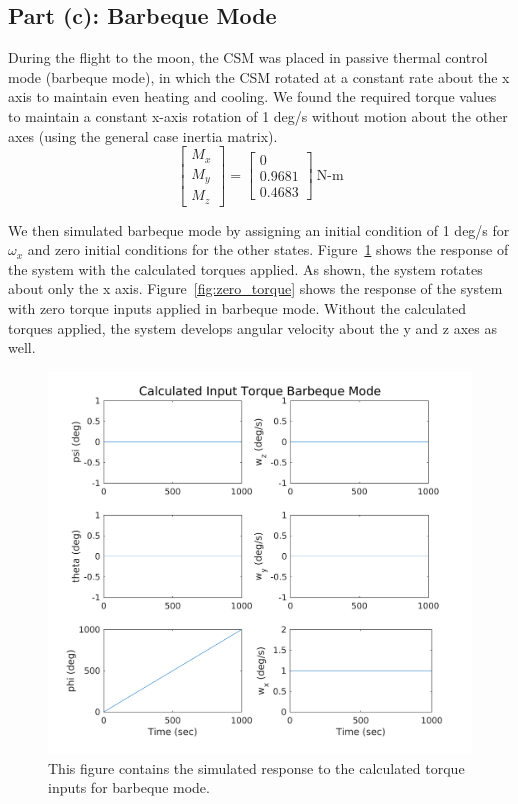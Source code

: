 \documentclass{article}
\begin{document}
\subsection{Part (c): Barbeque Mode}\label{BBQ}
During the flight to the moon, the CSM was placed in passive thermal control mode (barbeque mode), in which the CSM rotated at a constant rate about the x axis to maintain even heating and cooling. We found the required torque values to maintain a constant x-axis rotation of 1 deg/s without motion about the other axes (using the general case inertia matrix).
\[
\begin{bmatrix}
M_x \\
M_y \\
M_z
\end{bmatrix}=
\begin{bmatrix}
0 \\
0.9681 \\
0.4683
\end{bmatrix} \:\text{N-m}
\]

We then simulated barbeque mode by assigning an initial condition of 1 deg/s for $\omega_x$ and zero initial conditions for the other states. Figure~\ref{fig:calc_torque} shows the response of the system with the calculated torques applied. As shown, the system rotates about only the x axis. Figure~\ref{fig:zero_torque} shows the response of the system with zero torque inputs applied in barbeque mode. Without the calculated torques applied, the system develops angular velocity about the y and z axes as well.

\begin{figure}[H]
  \includegraphics[width=\linewidth]{calc_torque_bbq_mode.png}
  \caption{This figure contains the simulated response to the calculated torque inputs for barbeque mode.}
  \label{fig:calc_torque}
\end{figure}
\end{document}
